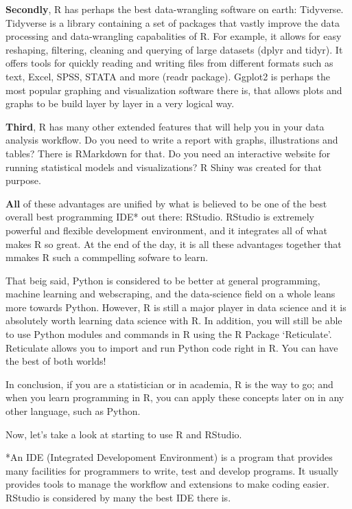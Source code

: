 \documentclass[]{book}
\begin{document}
\textbf{Secondly}, R has perhaps the best data-wrangling software on earth: Tidyverse. Tidyverse is a library containing a set of packages that vastly improve the data processing and data-wrangling capabalities of R. For example, it allows for easy reshaping, filtering, cleaning and querying of large datasets (dplyr and tidyr). It offers tools for quickly reading and writing files from different formats such as text, Excel, SPSS, STATA and more (readr package). Ggplot2 is perhaps the most popular graphing and visualization software there is, that allows plots and graphs to be build layer by layer in a very logical way.

\textbf{Third}, R has many other extended features that will help you in your data analysis workflow. Do you need to write a report with graphs, illustrations and tables? There is RMarkdown for that. Do you need an interactive website for running statistical models and visualizations? R Shiny was created for that purpose.

\textbf{All} of these advantages are unified by what is believed to be one of the best overall best programming IDE* out there: RStudio. RStudio is extremely powerful and flexible development environment, and it integrates all of what makes R so great. At the end of the day, it is all these advantages together that mmakes R such a commpelling sofware to learn.

That beig said, Python is considered to be better at general programming, machine learning and webscraping, and the data-science field on a whole leans more towards Python. However, R is still a major player in data science and it is absolutely worth learning data science with R. In addition, you will still be able to use Python modules and commands in R using the R Package `Reticulate'. Reticulate allows you to import and run Python code right in R. You can have the best of both worlds!

In conclusion, if you are a statistician or in academia, R is the way to go; and when you learn programming in R, you can apply these concepts later on in any other language, such as Python.

Now, let's take a look at starting to use R and RStudio.

*An IDE (Integrated Developoment Environment) is a program that provides many facilities for programmers to write, test and develop programs. It usually provides tools to manage the workflow and extensions to make coding easier. RStudio is considered by many the best IDE there is.
\end{document}
